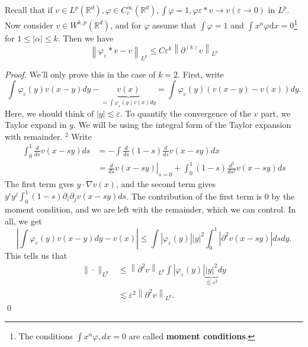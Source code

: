 \begin{lemma}
[Mollifer]
\label{lem: Mollifer}
Recall that if $v \in L^{p}\left(\mathbb{R}^{d}\right), \varphi \in C_{c}^{\infty}\left(\mathbb{R}^{d}\right), \int \varphi=1, \varphi \varepsilon * v \rightarrow v(\varepsilon \rightarrow 0)$ in $L^{p}$. Now consider $v \in W^{k, p}\left(\mathbb{R}^{d}\right)$, and for $\varphi$ assume that $\int \varphi = 1$ and $\int x^{\alpha} \varphi \mathrm{d} x=0$\footnote{The conditions $\int x^\alpha \varphi,dx = 0$ are called \textbf{moment conditions}.} for $1 \leq|\alpha| \leq k$. Then we have
$$
\left\|\varphi_{\varepsilon} * v-v\right\|_{L^{p}} \leq C \varepsilon^{k}\left\|\partial^{(k)} v\right\|_{L^{p}}
$$
\end{lemma}
\begin{proof}
     We'll only prove this in the case of $k=2$. First, write
     $$
     \int \varphi_{\varepsilon}(y) v(x-y) d y-\underbrace{v(x)}_{=\int \varphi_{\varepsilon}(y) v(x) d y}=\int \varphi_{\varepsilon}(y)(v(x-y)-v(x)) d y .
     $$
     Here, we should think of $|y| \lesssim \varepsilon$. To quantify the convergence of the $v$ part, we Taylor expand in $y$. We will be using the integral form of the Taylor expansion with remainder. ${ }^{2}$ Write
     $$
     \begin{aligned}
     \int_{0}^{1} \frac{d}{d s} v(x-s y) d s &=-\int \frac{d}{d s}(1-s) \frac{d}{d s} v(x-s y) d x \\
     &=\left.\frac{d}{d s} v(x-s y)\right|_{s=0}+\int_{0}^{1}(1-s) \frac{d^{2}}{d s^{2}} v(x-s y) d s
     \end{aligned}
     $$
     The first term gves $y \cdot \nabla v(x)$, and the second term gives $y^{i} y^{j} \int_{0}^{1}(1-s) \partial_{i} \partial_{j} v(x-s y) d s$. The contribution of the first term is 0 by the moment condition, and we are left with the remainder, which we can control. In all, we get
     $$
     \left|\int \varphi_{\varepsilon}(y) v(x-y) d y-v(x)\right| \leq \int\left|\varphi_{\varepsilon}(y)\right||y|^{2} \int_{0}^{1}\left|\partial^{2} v(x-s y)\right| d s d y .
     $$
     This tells us that
     $$
     \begin{aligned}
     \|\cdot\|_{L^{p}} & \leq\left\|\partial^{2} v\right\|_{L^{p}} \int\left|\varphi_{\varepsilon}(y)\right| \underbrace{|y|^{2}}_{\lesssim \varepsilon^{2}} d y \\
     & \lesssim \varepsilon^{2}\left\|\partial^{2} v\right\|_{L^{p}} .
     \end{aligned}
     $$
     \qed
\end{proof}

